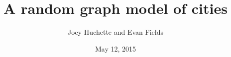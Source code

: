 \documentclass[11pt]{beamer}
\title{A random graph model of cities}
\author{Joey Huchette and Evan Fields}
\institute{6.268}
\date{May 12, 2015}
\begin{document}
\begin{frame}
\titlepage
\end{frame}
\end{document}
